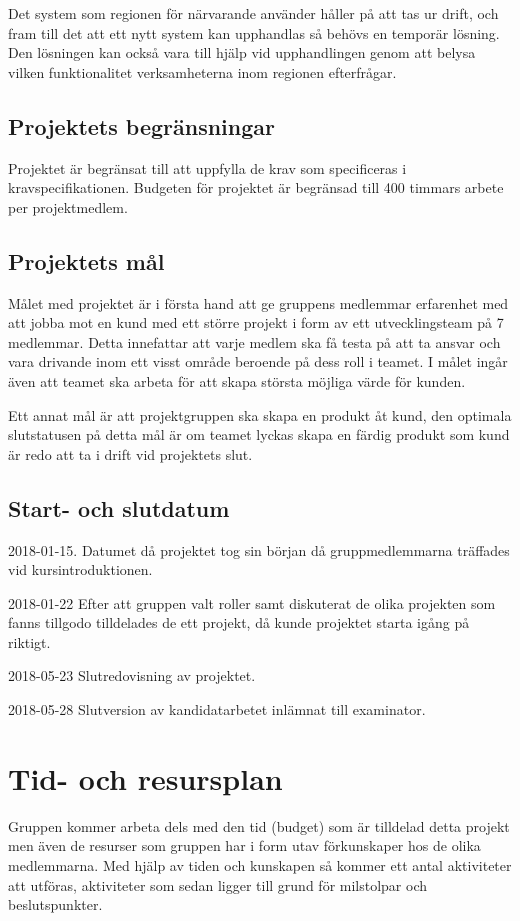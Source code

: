 \documentclass[a4paper,10pt]{article}
\begin{document}
Det system som regionen för närvarande använder håller på att tas ur drift, och fram till det att ett nytt system kan upphandlas så behövs en temporär lösning. Den lösningen kan också vara till hjälp vid upphandlingen genom att belysa vilken funktionalitet verksamheterna inom regionen efterfrågar.
\subsection{Projektets begränsningar}
Projektet är begränsat till att uppfylla de krav som specificeras i kravspecifikationen. Budgeten för projektet är begränsad till 400 timmars arbete per projektmedlem.
\subsection{Projektets mål}
Målet med projektet är i första hand att ge gruppens medlemmar erfarenhet med att jobba mot en kund med ett större projekt i form av ett utvecklingsteam på 7 medlemmar. Detta innefattar att varje medlem ska få testa på att ta ansvar och vara drivande inom ett visst område beroende på dess roll i teamet. I målet ingår även att teamet ska arbeta för att skapa största möjliga värde för kunden.

Ett annat mål är att projektgruppen ska skapa en produkt åt kund, den optimala slutstatusen på detta mål är om teamet lyckas skapa en färdig produkt som kund är redo att ta i drift vid projektets slut.
\subsection{Start- och slutdatum}
2018-01-15.
Datumet då projektet tog sin början då gruppmedlemmarna träffades vid kursintroduktionen.

2018-01-22
Efter att gruppen valt roller samt diskuterat de olika projekten som fanns tillgodo tilldelades de ett projekt, då kunde projektet starta igång på riktigt.

2018-05-23
Slutredovisning av projektet.

2018-05-28
Slutversion av kandidatarbetet inlämnat till examinator.
\section{Tid- och resursplan}
Gruppen kommer arbeta dels med den tid (budget) som är tilldelad detta projekt men även de resurser som gruppen har i form utav förkunskaper hos de olika medlemmarna. Med hjälp av tiden och kunskapen så kommer ett antal aktiviteter att utföras, aktiviteter som sedan ligger till grund för milstolpar och beslutspunkter.
\end{document}
